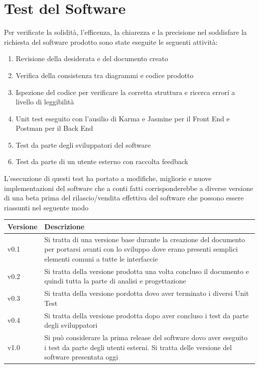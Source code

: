 \documentclass[a4paper, 11pt,oneside]{book}
\begin{document}
\chapter{Test del Software}
    Per verificate la solidità, l'efficenza, la chiarezza e la precisione nel soddisfare la richiesta del software prodotto sono state eseguite le seguenti attività:
    \begin{enumerate}
        \item Revisione della desiderata e del documento creato
        \item Verifica della consistenza tra diagrammi e codice prodotto
        \item Ispezione del codice per verificare la corretta struttura e ricerca errori a livello di leggibilità
        \item Unit test eseguito con l'ausilio di Karma e Jasmine per il Front End e Postman per il Back End
        \item Test da parte degli sviluppatori del software
        \item Test da parte di un utente esterno con raccolta feedback
    \end{enumerate}
    L'esecuzione di questi test ha portato a modifiche, migliorie e nuove implementazioni del software che a conti fatti corrisponderebbe a diverse versione di una beta prima del rilascio/vendita effettiva del software che possono essere riassunti nel seguente modo
    \begin{center}
        \begin{tabular}{|| m{} | m{} ||}
            \hline
            Versione & Descrizione \\
            \hline
            \hline
            v0.1 & Si tratta di una versione base durante la creazione del documento per portarsi avanti con lo sviluppo dove erano presenti semplici elementi comuni a tutte le interfaccie\\
            \hline
            v0.2 & Si tratta della versione prodotta una volta concluso il documento e quindi tutta la parte di analisi e progettazione \\
            \hline
            v0.3 & Si tratta della versione pordotta dovo aver terminato i diversi Unit Test \\
            \hline
            v0.4 & Si tratta della versione prodotta dopo aver concluso i test da parte degli sviluppatori \\
            \hline
            v1.0 & Si può considerare la prima release del software dovo aver eseguito i test da parte degli utenti esterni. Si tratta delle versione del software presentata oggi \\
            \hline
        \end{tabular}
    \end{center}
\end{document}
